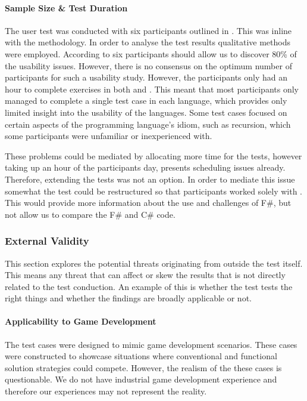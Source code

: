 \paragraph{Sample Size \& Test Duration}
The user test was conducted with six participants outlined in . This was inline with the \champagne methodology. In order to analyse the test results qualitative methods were employed. According to \cite{virzi1992refining} six participants should allow us to discover 80\% of the usability issues. However, there is no consensus on the optimum number of participants for such a usability study\cite{hwang2010number}. However, the participants only had an hour to complete exercises in both \fs and \cs. This meant that most participants only managed to complete a single test case in each language, which provides only limited insight into the usability of the languages. Some test cases focused on certain aspects of the programming language's idiom, such as recursion, which some participants were unfamiliar or inexperienced with.

These problems could be mediated by allocating more time for the tests, however taking up an hour of the participants day, presents scheduling issues already. Therefore, extending the tests was not an option. In order to mediate this issue somewhat the test could be restructured so that participants worked solely with \fs. This would provide more information about the use and challenges of F\#, but not allow us to compare the F\# and C\# code.

\subsubsection{External Validity}
This section explores the potential threats originating from outside the test itself. This means any threat that can affect or skew the results that is not directly related to the test conduction. An example of this is whether the test tests the right things and whether the findings are broadly applicable or not.

\paragraph{Applicability to Game Development}
The test cases were designed to mimic game development scenarios. These cases were constructed to showcase situations where conventional and functional solution strategies could compete. However, the realism of the these cases is questionable. We do not have industrial game development experience and therefore our experiences may not represent the reality.

